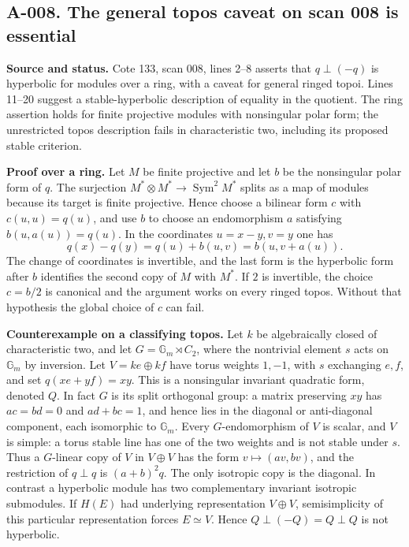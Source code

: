 \documentclass[11pt]{article}
\begin{document}
\subsection*{A-008. The general topos caveat on scan 008 is essential}
\textbf{Source and status.} Cote 133, scan 008, lines 2--8 asserts that
$q\perp(-q)$ is hyperbolic for modules over a ring, with a caveat for
general ringed topoi.  Lines 11--20 suggest a stable-hyperbolic
description of equality in the quotient.  The ring assertion holds for
finite projective modules with nonsingular polar form; the unrestricted
topos description fails in characteristic two, including its proposed
stable criterion.

\textbf{Proof over a ring.} Let $M$ be finite projective and let $b$ be
the nonsingular polar form of $q$.  The surjection
$M^*\otimes M^*\longrightarrow\operatorname{Sym}^2M^*$ splits as a
map of modules because its target is finite projective.  Hence choose
a bilinear form $c$ with $c(u,u)=q(u)$, and use $b$ to choose an
endomorphism $a$ satisfying $b(u,a(u))=q(u)$.  In the coordinates
$u=x-y,v=y$ one has
\[
 q(x)-q(y)=q(u)+b(u,v)=b(u,v+a(u)).
\]
The change of coordinates is invertible, and the last form is the
hyperbolic form after $b$ identifies the second copy of $M$ with $M^*$.
If $2$ is invertible, the choice $c=b/2$ is canonical and the argument
works on every ringed topos.  Without that hypothesis the global choice
of $c$ can fail. 

\textbf{Counterexample on a classifying topos.}
Let $k$ be algebraically closed of characteristic two, and let
$G=\mathbb G_m\rtimes C_2$, where the nontrivial element $s$ acts on
$\mathbb G_m$ by inversion.  Let $V=ke\oplus kf$ have torus weights
$1,-1$, with $s$ exchanging $e,f$, and set $q(xe+yf)=xy$.
This is a nonsingular invariant quadratic form, denoted $Q$.
In fact $G$ is its split orthogonal group: a matrix preserving $xy$
has $ac=bd=0$ and $ad+bc=1$, and hence lies in the diagonal or
anti-diagonal component, each isomorphic to $\mathbb G_m$.
Every $G$-endomorphism of $V$ is scalar, and $V$ is simple: a torus
stable line has one of the two weights and is not stable under $s$.
Thus a $G$-linear copy of $V$ in $V\oplus V$ has the form
$v\mapsto(av,bv)$, and the restriction of $q\perp q$ is
$(a+b)^2q$.  The only isotropic copy is the diagonal.  In contrast a
hyperbolic module has two complementary invariant isotropic submodules.
If $H(E)$ had underlying representation $V\oplus V$, semisimplicity
of this particular representation forces $E\simeq V$.  Hence
$Q\perp(-Q)=Q\perp Q$ is not hyperbolic.
\end{document}
